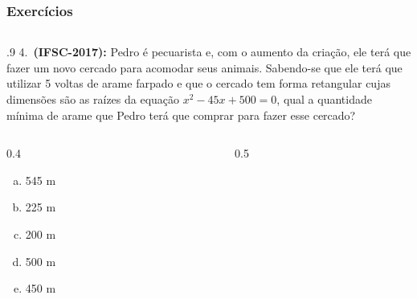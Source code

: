 \documentclass[aspectratio=169, t, 8pt]{beamer}
\begin{document}
    \begin{frame}
        \frametitle{Exercícios}
        \begin{columns}
            \begin{column}{.9\textwidth}
                4.~\textbf{(IFSC-2017): }Pedro é pecuarista e, com o aumento da criação, ele terá que fazer um novo cercado para acomodar seus animais. Sabendo-se que ele terá que utilizar 5 voltas de arame farpado e que o cercado tem forma retangular cujas dimensões são as raízes da equação $x^2 - 45x + 500 = 0$, qual a quantidade mínima de arame que Pedro terá que comprar para fazer esse cercado?

                \begin{columns}
                    \begin{column}{0.4\textwidth}
                         
                        \begin{enumerate}[a.]
                            \item 545 m
                            \item 225 m
                            \item 200 m
                            \item 500 m
                            \item 450 m
                        \end{enumerate}
                    \end{column}
                    \begin{column}{0.5\textwidth}
                        
                    \end{column}
                \end{columns}
            \end{column}
        \end{columns}
    \end{frame}
\end{document}
